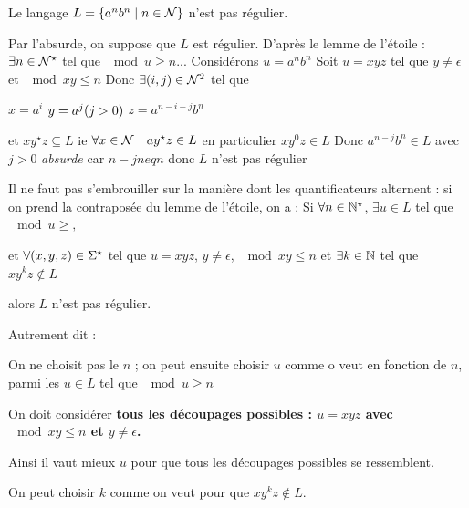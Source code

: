 \documentclass[a4paper,french,bookmarks]{book}
\begin{document}
    \begin{theorem}{}{}
        Le langage $L = \left\{a^n b^n \;\middle\vert\; n \in \mathcal{N}\right\}$ n'est pas régulier.
    \end{theorem}
    
    \begin{nproof}
        Par l'absurde, on suppose que $L$ est régulier. D'après le lemme de l'étoile : $\exists n \in \mathcal{N}^\star$ tel que $\mod{u} \geq n$...
        Considérons $u = a^n b^n$
        Soit $u = x y z$ tel que $y \neq \epsilon$ et $\mod{xy} \leq n$
        Donc $\exists  \!\left(i, j\right) \in \mathcal{N}^2$ tel que
        \begin{enumerate}
            \itt $x = a^i$
            \itt $y =a^j \!\left(j > 0\right)$
            \itt $z = a^{n-i-j} b^n$
        \end{enumerate}
        et $x y^\star z \subseteq L$
        ie $\forall x \in \mathcal{N} \quad a y^\star z \in L$ en particulier $x y^0 z \in L$
        Donc $a^{n-j} b^n \in L$
        avec $j>0$ \emph{absurde} car $n-j neq n$
        donc $L$ n'est pas régulier
    \end{nproof}
    
    \begin{warning}{}{}
        Il ne faut pas s'embrouiller sur la manière dont les quantificateurs alternent : si on prend la contraposée du lemme de l'étoile, on a :
        Si $\forall n \in \mathbb{N}^\star$, $\exists u \in L$ tel que $\mod{u} \geq ,$
        
        et $\forall \!\left(x, y, z\right) \in \Sigma^\star$ tel que $u = xyz$, $y \neq \epsilon$, $\mod{xy} \leq n$ et $\exists k \in \mathbb{N}$ tel que $xy^kz \not\in L$
        
        alors $L$ n'est pas régulier.
        
        Autrement dit :
        \begin{enumerate}
            \itt On ne choisit pas le $n$ ;
            \itt on peut ensuite choisir $u$ comme o veut en fonction de $n$, parmi les $u \in L$ tel que $\mod{u} \geq n$
            
            \itt On doit considérer \bf{tous} les découpages possibles :
            $u = xyz$ avec $\mod{xy} \leq n$ et $y \neq \epsilon$.
            
            Ainsi il vaut mieux  $u$ pour que tous les découpages possibles se ressemblent. 
            
            \itt On peut choisir $k$ comme on veut pour que $xy^kz \not\in L$.
        \end{enumerate}
    \end{warning}
    
\end{document}
